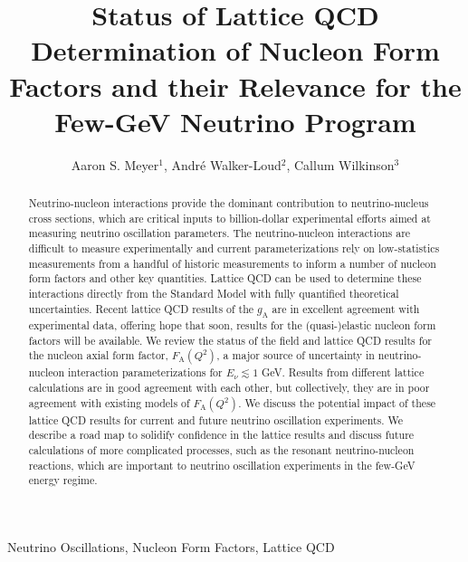 \documentclass{ar-1col}
\begin{document}

\title{Status of Lattice QCD Determination of Nucleon Form Factors
 and their Relevance for the Few-GeV Neutrino Program}

\author{Aaron S. Meyer$^1$,
Andr\'{e} Walker-Loud$^2$,
Callum Wilkinson$^3$
}

\begin{abstract}
Neutrino-nucleon interactions provide the dominant contribution to neutrino-nucleus cross sections, which are critical inputs to billion-dollar experimental efforts aimed at measuring neutrino oscillation parameters.
The neutrino-nucleon interactions are difficult to measure experimentally and current parameterizations
rely on low-statistics measurements from a handful of historic measurements to inform a number of nucleon form factors and other key quantities.
Lattice QCD can be used to determine these interactions directly from the Standard Model with fully quantified theoretical uncertainties.
Recent lattice QCD results of the $g_{\mathrm{A}}$ are in excellent agreement with experimental data,
offering hope that soon, results for the (quasi-)elastic nucleon form factors will be available.
We review the status of the field and lattice QCD results for the nucleon axial form factor, $F_{\mathrm{A}}(Q^2)$, a major source of uncertainty in neutrino-nucleon interaction parameterizations for $E_{\nu} \lesssim 1$ GeV.
Results from different lattice calculations are in good agreement with each other, but collectively, they are in poor agreement with existing models of $F_{\mathrm{A}}(Q^2)$.
We discuss the potential impact of these lattice QCD results for current and future neutrino oscillation experiments.
We describe a road map to solidify confidence in the lattice results and discuss future calculations of more complicated processes, such as the resonant neutrino-nucleon reactions, which are important to neutrino oscillation experiments in the few-GeV energy regime.
\end{abstract}

\begin{keywords}
Neutrino Oscillations, Nucleon Form Factors, Lattice QCD
\end{keywords}
\end{document}
